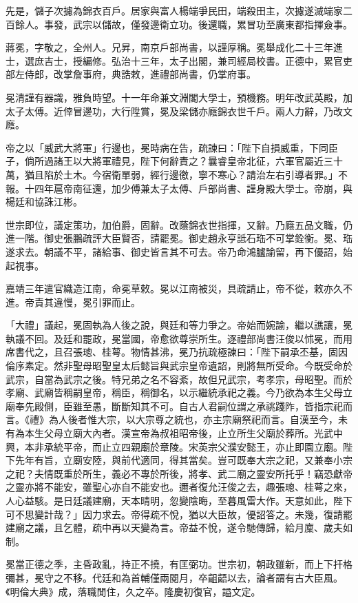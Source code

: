 \begin{pinyinscope}
先是，儲子次攄為錦衣百戶。居家與富人楊端爭民田，端殺田主，次攄遂滅端家二百餘人。事發，武宗以儲故，僅發邊衛立功。後還職，累冒功至廣東都指揮僉事。

蔣冕，字敬之，全州人。兄昇，南京戶部尚書，以謹厚稱。冕舉成化二十三年進士，選庶吉士，授編修。弘治十三年，太子出閣，兼司經局校書。正德中，累官吏部左侍郎，改掌詹事府，典誥敕，進禮部尚書，仍掌府事。

冕清謹有器識，雅負時望。十一年命兼文淵閣大學士，預機務。明年改武英殿，加太子太傅。近倖冒邊功，大行陞賞，冕及梁儲亦廕錦衣世千戶。兩人力辭，乃改文廕。

帝之以「威武大將軍」行邊也，冕時病在告，疏諫曰：「陛下自損威重，下同臣子，倘所過諸王以大將軍禮見，陛下何辭責之？曩睿皇帝北征，六軍官屬近三十萬，猶且陷於土木。今宿衛單弱，經行邊徼，寧不寒心？請治左右引導者罪。」不報。十四年扈帝南征還，加少傅兼太子太傅、戶部尚書、謹身殿大學士。帝崩，與楊廷和協誅江彬。

世宗即位，議定策功，加伯爵，固辭。改蔭錦衣世指揮，又辭。乃廕五品文職，仍進一階。御史張鵬疏評大臣賢否，請罷冕。御史趙永亨詆石珤不可掌銓衡。冕、珤遂求去。朝議不平，諸給事、御史皆言其不可去。帝乃命鴻臚諭留，再下優詔，始起視事。

嘉靖三年遣官織造江南，命冕草敕。冕以江南被災，具疏請止，帝不從，敕亦久不進。帝責其違慢，冕引罪而止。

「大禮」議起，冕固執為人後之說，與廷和等力爭之。帝始而婉諭，繼以譙讓，冕執議不回。及廷和罷政，冕當國，帝愈欲尊崇所生。逐禮部尚書汪俊以怵冕，而用席書代之，且召張璁、桂萼。物情甚沸，冕乃抗疏極諫曰：「陛下嗣承丕基，固因倫序素定。然非聖母昭聖皇太后懿旨與武宗皇帝遺詔，則將無所受命。今既受命於武宗，自當為武宗之後。特兄弟之名不容紊，故但兄武宗，考孝宗，母昭聖。而於孝廟、武廟皆稱嗣皇帝，稱臣，稱御名，以示繼統承祀之義。今乃欲為本生父母立廟奉先殿側，臣雖至愚，斷斷知其不可。自古人君嗣位謂之承祧踐阼，皆指宗祀而言。《禮》為人後者惟大宗，以大宗尊之統也，亦主宗廟祭祀而言。自漢至今，未有為本生父母立廟大內者。漢宣帝為叔祖昭帝後，止立所生父廟於葬所。光武中興，本非承統平帝，而止立四親廟於章陵。宋英宗父濮安懿王，亦止即園立廟。陛下先年有旨，立廟安陸，與前代適同，得其當矣。豈可既奉大宗之祀，又兼奉小宗之祀？夫情既重於所生，義必不專於所後，將孝、武二廟之靈安所托乎！竊恐獻帝之靈亦將不能安，雖聖心亦自不能安也。邇者復允汪俊之去，趣張璁、桂萼之來，人心益駭。是日廷議建廟，天本晴明，忽變陰晦，至暮風雷大作。天意如此，陛下可不思變計哉？」因力求去。帝得疏不悅，猶以大臣故，優詔答之。未幾，復請罷建廟之議，且乞體，疏中再以天變為言。帝益不悅，遂令馳傳歸，給月廩、歲夫如制。

冕當正德之季，主昏政亂，持正不撓，有匡弼功。世宗初，朝政雖新，而上下扞格彌甚，冕守之不移。代廷和為首輔僅兩閱月，卒齟齬以去，論者謂有古大臣風。《明倫大典》成，落職閒住，久之卒。隆慶初復官，謚文定。


\end{pinyinscope}
